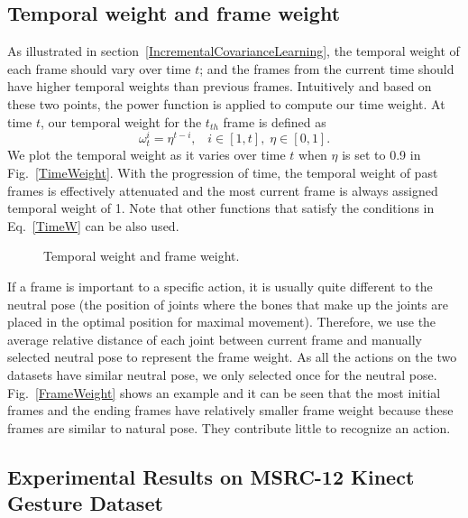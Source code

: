 \documentclass[sigconf]{acmart}
\begin{document}
\subsection{Temporal weight and frame weight}
As illustrated in section~\ref{IncrementalCovarianceLearning},
the temporal weight of each frame should vary over time $t$;
and the frames from the current time should have higher temporal weights than
previous frames. Intuitively and based on these two points, the
power function is applied to compute our time weight. At time $t$, our temporal weight for
the $t_{th}$ frame is defined as
\begin{equation}\label{SpecificTimeW}
\omega _t^i = {\eta ^{t - i}},\;\;\;i \in [1,t],\;\eta  \in [0,1].
\end{equation}
We plot the temporal weight as it varies over time $t$ when
$\eta$ is set to 0.9 in Fig.~\ref{TimeWeight}. With the progression of time,
the temporal weight of past frames is effectively attenuated and
the most current frame is always assigned temporal weight of 1. Note that
other functions that satisfy the conditions in Eq.~\ref{TimeW} can be also used.

\begin{figure}
  \centering
  \caption{Temporal weight and frame weight.}
  \label{Weight} %
\end{figure}

If a frame is important to a specific action, it is usually
quite different to the neutral pose (the position of joints where the bones that make up the joints are placed in the optimal position for maximal movement). Therefore, we use the average relative
distance of each joint between current frame and manually selected neutral pose to represent the frame weight. As all the actions on the two datasets have similar neutral pose, we only selected once for the neutral pose.
Fig.~\ref{FrameWeight} shows an example and it can be seen that the most initial
frames and the ending frames have relatively smaller frame weight because these
frames are similar to natural pose. They contribute little to recognize an
action.

\subsection{Experimental Results on MSRC-12 Kinect Gesture Dataset}
\end{document}
